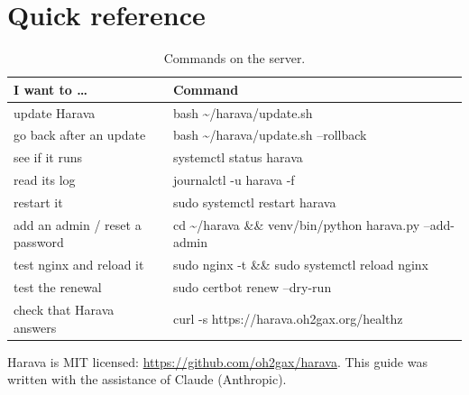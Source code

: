 \documentclass[10pt,a4paper]{article}
\begin{document}
\section{Quick reference}\label{sec:quick}
\begin{table}[H]\small\centering
\begin{tabularx}{\textwidth}{>{\raggedright}p{4.4cm}>{\ttfamily\small}X}
\toprule
\textbf{I want to \dots} & \normalfont\textbf{Command}\\
\midrule
update Harava & bash \textasciitilde/harava/update.sh\\
go back after an update & bash \textasciitilde/harava/update.sh --rollback\\
see if it runs & systemctl status harava\\
read its log & journalctl -u harava -f\\
restart it & sudo systemctl restart harava\\
add an admin / reset a password & cd \textasciitilde/harava \&\& venv/bin/python harava.py --add-admin\\
test nginx and reload it & sudo nginx -t \&\& sudo systemctl reload nginx\\
test the renewal & sudo certbot renew --dry-run\\
check that Harava answers & curl -s https://harava.oh2gax.org/healthz\\
\bottomrule
\end{tabularx}
\caption{Commands on the server.}
\end{table}

\vfill
{\small Harava is MIT licensed: \url{https://github.com/oh2gax/harava}. This guide was written with the assistance of Claude (Anthropic).}
\end{document}
